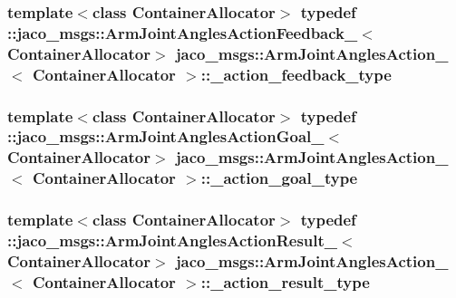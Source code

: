 \subsubsection[{\texorpdfstring{\+\_\+action\+\_\+feedback\+\_\+type}{_action_feedback_type}}]{\setlength{\rightskip}{0pt plus 5cm}template$<$class Container\+Allocator$>$ typedef \+::{\bf jaco\+\_\+msgs\+::\+Arm\+Joint\+Angles\+Action\+Feedback\+\_\+}$<$Container\+Allocator$>$ {\bf jaco\+\_\+msgs\+::\+Arm\+Joint\+Angles\+Action\+\_\+}$<$ Container\+Allocator $>$\+::{\bf \+\_\+action\+\_\+feedback\+\_\+type}}\hypertarget{structjaco__msgs_1_1ArmJointAnglesAction___a18181acdd2f5776a83dd75f0b8a17d2a}{}\label{structjaco__msgs_1_1ArmJointAnglesAction___a18181acdd2f5776a83dd75f0b8a17d2a}
\subsubsection[{\texorpdfstring{\+\_\+action\+\_\+goal\+\_\+type}{_action_goal_type}}]{\setlength{\rightskip}{0pt plus 5cm}template$<$class Container\+Allocator$>$ typedef \+::{\bf jaco\+\_\+msgs\+::\+Arm\+Joint\+Angles\+Action\+Goal\+\_\+}$<$Container\+Allocator$>$ {\bf jaco\+\_\+msgs\+::\+Arm\+Joint\+Angles\+Action\+\_\+}$<$ Container\+Allocator $>$\+::{\bf \+\_\+action\+\_\+goal\+\_\+type}}\hypertarget{structjaco__msgs_1_1ArmJointAnglesAction___a096e56f63aae41aad15c7d8d5b5f6d0e}{}\label{structjaco__msgs_1_1ArmJointAnglesAction___a096e56f63aae41aad15c7d8d5b5f6d0e}
\subsubsection[{\texorpdfstring{\+\_\+action\+\_\+result\+\_\+type}{_action_result_type}}]{\setlength{\rightskip}{0pt plus 5cm}template$<$class Container\+Allocator$>$ typedef \+::{\bf jaco\+\_\+msgs\+::\+Arm\+Joint\+Angles\+Action\+Result\+\_\+}$<$Container\+Allocator$>$ {\bf jaco\+\_\+msgs\+::\+Arm\+Joint\+Angles\+Action\+\_\+}$<$ Container\+Allocator $>$\+::{\bf \+\_\+action\+\_\+result\+\_\+type}}\hypertarget{structjaco__msgs_1_1ArmJointAnglesAction___a24f1e437de783673dbbf81603f3e02a4}{}\label{structjaco__msgs_1_1ArmJointAnglesAction___a24f1e437de783673dbbf81603f3e02a4}
